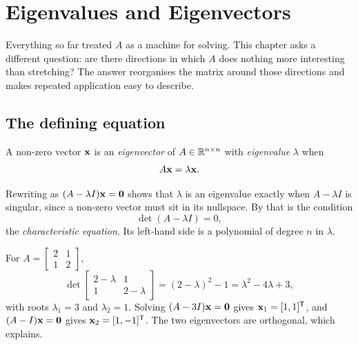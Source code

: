 \setchapterpreamble[u]{\margintoc}
\chapter{Eigenvalues and Eigenvectors}


Everything so far treated \(A\) as a machine for solving. This chapter asks a
different question: are there directions in which \(A\) does nothing more
interesting than stretching? The answer reorganises the matrix around those
directions and makes repeated application easy to describe.

\section{The defining equation}

\begin{definition}
A non-zero vector \(\mathbf{x}\) is an \emph{eigenvector} of \(A\in\mathbb{R}^{n\times n}\)
with \emph{eigenvalue} \(\lambda\) when
\[
	A\mathbf{x}=\lambda\mathbf{x}.
\]
\end{definition}

Rewriting as \((A-\lambda I)\mathbf{x}=\mathbf{0}\) shows that \(\lambda\) is an
eigenvalue exactly when \(A-\lambda I\) is singular, since a non-zero vector must
sit in its nullspace. By  that is the condition
\[
	\det(A-\lambda I)=0,
\]
the \emph{characteristic equation}. Its left-hand side is a polynomial of degree
\(n\) in \(\lambda\).


\begin{example}
For \(A=\begin{bmatrix}2&1\\1&2\end{bmatrix}\),
\[
	\det\begin{bmatrix}2-\lambda&1\\1&2-\lambda\end{bmatrix}
	=(2-\lambda)^{2}-1=\lambda^{2}-4\lambda+3,
\]
with roots \(\lambda_1=3\) and \(\lambda_2=1\). Solving
\((A-3I)\mathbf{x}=\mathbf{0}\) gives \(\mathbf{x}_1=[1,1]^{\mathsf{T}}\), and
\((A-I)\mathbf{x}=\mathbf{0}\) gives \(\mathbf{x}_2=[1,-1]^{\mathsf{T}}\). The two eigenvectors
are orthogonal, which  explains.
\end{example}

